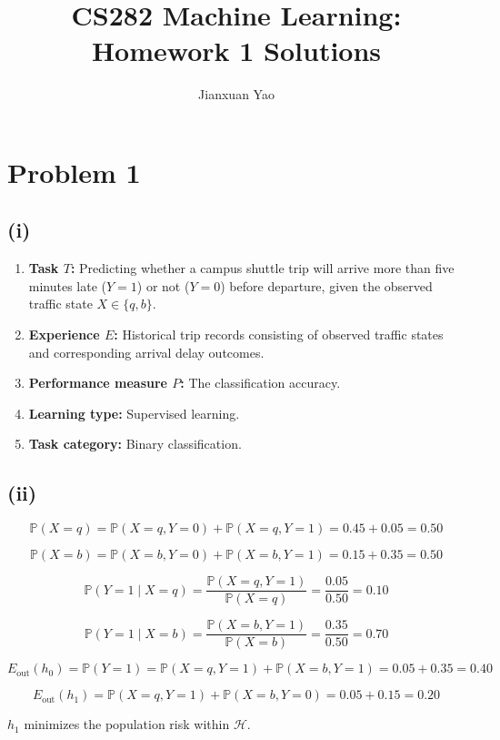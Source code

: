 \documentclass[11pt]{article}
\title{CS282 Machine Learning: Homework 1 Solutions}
\author{Jianxuan Yao}
\date{}
\begin{document}
\maketitle

\section*{Problem 1}

\subsection*{(i)}

\begin{enumerate}
    \item \textbf{Task $T$:} Predicting whether a campus shuttle trip will arrive more than five minutes late ($Y=1$) or not ($Y=0$) before departure, given the observed traffic state $X \in \{q, b\}$.
    \item \textbf{Experience $E$:} Historical trip records consisting of observed traffic states and corresponding arrival delay outcomes.
    \item \textbf{Performance measure $P$:} The classification accuracy.
    \item \textbf{Learning type:} Supervised learning.
    \item \textbf{Task category:} Binary classification.
\end{enumerate}

\subsection*{(ii)}

$$
\mathbb{P}(X=q) = \mathbb{P}(X=q, Y=0) + \mathbb{P}(X=q, Y=1) = 0.45 + 0.05 = 0.50
$$

$$
\mathbb{P}(X=b) = \mathbb{P}(X=b, Y=0) + \mathbb{P}(X=b, Y=1) = 0.15 + 0.35 = 0.50
$$

$$
\mathbb{P}(Y=1 \mid X=q) = \frac{\mathbb{P}(X=q, Y=1)}{\mathbb{P}(X=q)} = \frac{0.05}{0.50} = 0.10
$$

$$
\mathbb{P}(Y=1 \mid X=b) = \frac{\mathbb{P}(X=b, Y=1)}{\mathbb{P}(X=b)} = \frac{0.35}{0.50} = 0.70
$$

$$
E_{\text{out}}(h_0) = \mathbb{P}(Y=1) = \mathbb{P}(X=q, Y=1) + \mathbb{P}(X=b, Y=1) = 0.05 + 0.35 = 0.40
$$

$$
E_{\text{out}}(h_1) = \mathbb{P}(X=q, Y=1) + \mathbb{P}(X=b, Y=0) = 0.05 + 0.15 = 0.20
$$

$h_1$ minimizes the population risk within $\mathcal{H}$.
\end{document}
